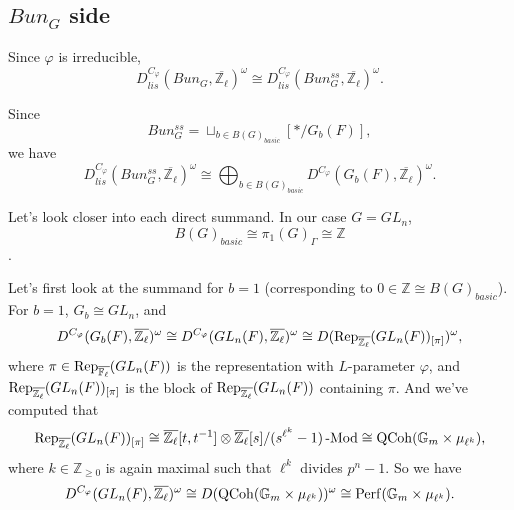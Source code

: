 \subsection{$Bun_G$ side}

Since $\varphi$ is irreducible, 
$$D^{C_{\varphi}}_{lis}(Bun_G, \overline{\mathbb{Z}_{\ell}})^{\omega} \cong D^{C_{\varphi}}_{lis}(Bun_G^{ss}, \overline{\mathbb{Z}_{\ell}})^{\omega}.$$

Since
$$Bun_G^{ss}=\sqcup_{b \in B(G)_{basic}}[*/G_b(F)],$$
we have 
$$D^{C_{\varphi}}_{lis}(Bun_G^{ss}, \overline{\mathbb{Z}_{\ell}})^{\omega} \cong \bigoplus_{b \in B(G)_{basic}}D^{C_{\varphi}}(G_b(F), \overline{\mathbb{Z}_{\ell}})^{\omega}.$$

Let's look closer into each direct summand. In our case $G=GL_n$, 
$$B(G)_{basic} \cong \pi_1(G)_{\Gamma} \cong \mathbb{Z}$$. 

Let's first look at the summand for $b=1$ (corresponding to $0 \in \mathbb{Z} \cong B(G)_{basic}$). For $b=1$, $G_b \cong GL_n$, and 
$$D^{C_{\varphi}}(G_b(F), \overline{\mathbb{Z}_{\ell}})^{\omega} \cong D^{C_{\varphi}}(GL_n(F), \overline{\mathbb{Z}_{\ell}})^{\omega} \cong D(\operatorname{\operatorname{Rep}}_{\overline{\mathbb{Z}_{\ell}}}(GL_n(F))_{[\pi]})^{\omega},$$
where $\pi \in \operatorname{\operatorname{Rep}}_{\overline{\mathbb{F}_{\ell}}}(GL_n(F))$ is the representation with $L$-parameter $\varphi$, and $\operatorname{\operatorname{Rep}}_{\overline{\mathbb{Z}_{\ell}}}(GL_n(F))_{[\pi]}$ is the block of $\operatorname{\operatorname{Rep}}_{\overline{\mathbb{Z}_{\ell}}}(GL_n(F))$ containing $\pi$.
And we've computed that
$$\operatorname{\operatorname{Rep}}_{\overline{\mathbb{Z}_{\ell}}}(GL_n(F))_{[\pi]} \cong \overline{\mathbb{Z}_{\ell}}[t, t^{-1}] \otimes \overline{\mathbb{Z}_{\ell}}[s]/(s^{\ell^k}-1)\operatorname{-Mod} \cong \operatorname{\operatorname{QCoh}}(\mathbb{G}_m \times \mu_{\ell^k}),$$
where $k \in \mathbb{Z}_{\geq 0}$ is again maximal such that $\ell^k$ divides $p^n-1$. So we have
$$D^{C_{\varphi}}(GL_n(F), \overline{\mathbb{Z}_{\ell}})^{\omega} \cong D(\operatorname{\operatorname{QCoh}}(\mathbb{G}_m \times \mu_{\ell^k}))^{\omega} \cong \operatorname{\operatorname{Perf}}(\mathbb{G}_m \times \mu_{\ell^k}).$$

